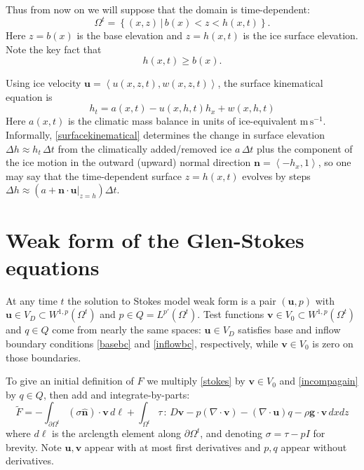 \documentclass[letterpaper,final,12pt,reqno]{amsart}
\newcommand{\hbn}{\hat{\mathbf{n}}}
\newcommand{\bn}{\mathbf{n}}
\newcommand{\bu}{\mathbf{u}}
\newcommand{\bv}{\mathbf{v}}
\begin{document}
Thus from now on we will suppose that the domain is time-dependent:
\begin{equation}
\Omega^t = \left\{(x,z)\,\big|\, b(x) < z < h(x,t)\right\}.  \label{Omegat}
\end{equation}
Here $z=b(x)$ is the base elevation and $z=h(x,t)$ is the ice surface elevation.  Note the key fact that
\begin{equation}
h(x,t) \ge b(x).  \label{admissibility}
\end{equation}

Using ice velocity $\bu=\left<u(x,z,t),w(x,z,t)\right>$, the surface kinematical equation is
\begin{equation}
h_t = a(x,t) - u(x,h,t) h_x + w(x,h,t) \label{surfacekinematical}
\end{equation}
Here $a(x,t)$ is the climatic mass balance in units of ice-equivalent $\text{m}\,\text{s}^{-1}$.  Informally, \eqref{surfacekinematical} determines the change in surface elevation $\Delta h \approx h_t\,\Delta t$ from the climatically added/removed ice $a\,\Delta t$ plus the component of the ice motion in the outward (upward) normal direction $\bn = \left<-h_x,1\right>$, so one may say that the time-dependent surface $z=h(x,t)$ evolves by steps $\Delta h \approx \left(a + \bn\cdot \bu|_{z=h}\right) \Delta t$.


\section{Weak form of the Glen-Stokes equations} \label{sec:weakformstokes}

At any time $t$ the solution to Stokes model weak form is a pair $(\bu,p)$ with $\bu\in V_D \subset W^{1,p}(\Omega^t)$ and $p \in Q=L^{p'}(\Omega^t)$.  Test functions $\bv\in V_0 \subset W^{1,p}(\Omega^t)$ and $q\in Q$ come from nearly the same spaces: $\bu\in V_D$ satisfies base and inflow boundary conditions \eqref{basebc} and \eqref{inflowbc}, respectively, while $\bv\in V_0$ is zero on those boundaries.

To give an initial definition of $F$ we multiply \eqref{stokes} by $\bv\in V_0$ and \eqref{incompagain} by $q\in Q$, then add and integrate-by-parts:
\begin{equation}
\tilde F = -\int_{\partial\Omega^t} (\sigma \hbn)\cdot \bv\,d\ell + \int_{\Omega^t} \tau \,:\,D\bv - p (\nabla \cdot \bv) - \left(\nabla \cdot \bu\right) q - \rho \mathbf{g} \cdot \bv \,dx dz \label{nonfunctwo}
\end{equation}
where $d\ell$ is the arclength element along $\partial\Omega^t$, and denoting $\sigma=\tau-pI$ for brevity.  Note $\bu,\bv$ appear with at most first derivatives and $p,q$ appear without derivatives.
\end{document}
